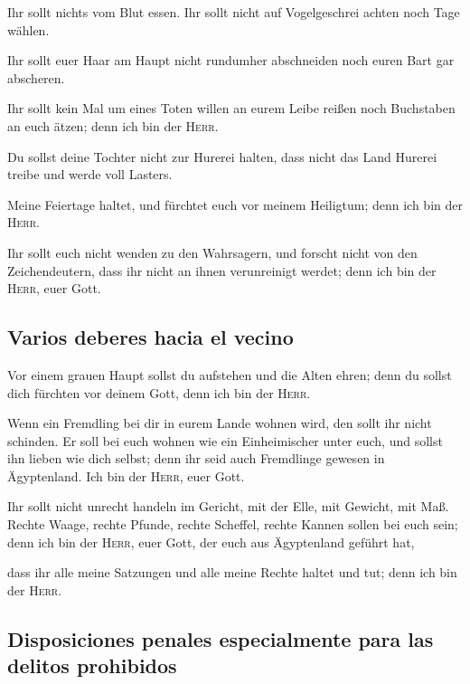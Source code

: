  Ihr sollt nichts vom Blut essen. Ihr sollt nicht auf
Vogelgeschrei achten noch Tage wählen.

 Ihr sollt euer Haar am Haupt nicht rundumher abschneiden
noch euren Bart gar abscheren.

 Ihr sollt kein Mal um eines Toten willen an eurem Leibe
reißen noch Buchstaben an euch ätzen; denn ich bin der \textsc{Herr}.

 Du sollst deine Tochter nicht zur Hurerei halten, dass
nicht das Land Hurerei treibe und werde voll Lasters.

 Meine Feiertage haltet, und fürchtet euch vor meinem
Heiligtum; denn ich bin der \textsc{Herr}.

 Ihr sollt euch nicht wenden zu den Wahrsagern, und
forscht nicht von den Zeichendeutern, dass ihr nicht an ihnen
verunreinigt werdet; denn ich bin der \textsc{Herr}, euer Gott.

\hypertarget{varios-deberes-hacia-el-vecino}{%
\subsection{Varios deberes hacia el
vecino}\label{varios-deberes-hacia-el-vecino}}

 Vor einem grauen Haupt sollst du aufstehen und die Alten
ehren; denn du sollst dich fürchten vor deinem Gott, denn ich bin der
\textsc{Herr}.

 Wenn ein Fremdling bei dir in eurem Lande wohnen wird,
den sollt ihr nicht schinden.  Er soll bei euch wohnen
wie ein Einheimischer unter euch, und sollst ihn lieben wie dich selbst;
denn ihr seid auch Fremdlinge gewesen in Ägyptenland. Ich bin der
\textsc{Herr}, euer Gott.

 Ihr sollt nicht unrecht handeln im Gericht, mit der
Elle, mit Gewicht, mit Maß.  Rechte Waage, rechte Pfunde,
rechte Scheffel, rechte Kannen sollen bei euch sein; denn ich bin der
\textsc{Herr}, euer Gott, der euch aus Ägyptenland geführt hat,

 dass ihr alle meine Satzungen und alle meine Rechte
haltet und tut; denn ich bin der \textsc{Herr}.

\hypertarget{disposiciones-penales-especialmente-para-las-delitos-prohibidos}{%
\subsection{Disposiciones penales especialmente para las delitos
prohibidos}\label{disposiciones-penales-especialmente-para-las-delitos-prohibidos}}

